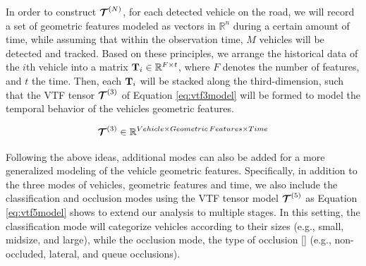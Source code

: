 \documentclass[sensors,article,submit,moreauthors,pdftex]{Definitions/mdpi}
\newcommand{\mathmat}[1]{\boldsymbol{\mathbf{\MakeUppercase{#1}}}}
\newcommand{\mathten}[1]{\boldsymbol{\mathbf{\mathcal{\MakeUppercase{#1}}}}}
\begin{document}


In order to construct $\mathten{T}^{(N)}$, for each detected vehicle on the road, we will record a set of geometric features modeled as vectors in $\mathbb{R}^n$ during a certain amount of time, while assuming that within the observation time, $M$ vehicles will be detected and tracked. Based on these principles, we arrange the historical data of the $i$th vehicle into a matrix $\mathmat{T}_i \in \mathbb{R}^{F \times t}$, where $F$ denotes the number of features, and $t$ the time. Then, each $\mathmat{T}_i$ will be stacked along the third-dimension, such that the VTF tensor $\mathten{T}^{(3)}$ of Equation \ref{eq:vtf3model} will be formed to model the temporal behavior of the vehicles geometric features.

\begin{equation}
\mathten{T}^{(3)} \in \mathbb{R}^{Vehicle \times Geometric\,Features \times Time}
\label{eq:vtf3model}
\end{equation}

Following the above ideas, additional modes can also be added for a more generalized modeling of the vehicle geometric features. Specifically, in addition to the three modes of vehicles, geometric features and time, we also include the classification and occlusion modes using the VTF tensor model $\mathten{T}^{(5)}$ as Equation \ref{eq:vtf5model} shows to extend our analysis to multiple stages. In this setting, the classification mode will categorize vehicles according to their sizes (e.g., small, midsize, and large), while the occlusion mode, the type of occlusion [] (e.g., non-occluded, lateral, and queue occlusions).
\end{document}
